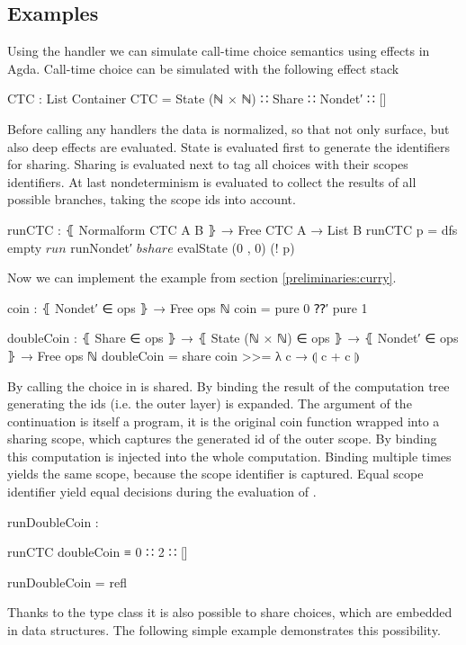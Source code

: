 \subsection{Examples}

Using the handler we can simulate call-time choice semantics using effects in
Agda.
Call-time choice can be simulated with the following effect stack

\begin{code}
CTC : List Container
CTC = State (ℕ × ℕ) ∷ Share ∷ Nondet′ ∷ []
\end{code}
Before calling any handlers the data is normalized, so that not only surface,
but also deep effects are evaluated.
State is evaluated first to generate the identifiers for sharing.
Sharing is evaluated next to tag all choices with their scopes identifiers.
At last nondeterminism is evaluated to collect the results of all possible
branches, taking the scope ids into account.

\begin{code}
runCTC : ⦃ Normalform CTC A B ⦄ → Free CTC A → List B
runCTC p = dfs empty $ run $ runNondet′ $ bshare $ evalState (0 , 0) (! p)
\end{code}
Now we can implement the  example from section
\ref{preliminaries:curry}.

\begin{code}
coin : ⦃ Nondet′ ∈ ops ⦄ → Free ops ℕ
coin = pure 0 ⁇′ pure 1

doubleCoin : ⦃ Share ∈ ops ⦄ → ⦃ State (ℕ × ℕ) ∈ ops ⦄ → ⦃ Nondet′ ∈ ops ⦄ →
  Free ops ℕ
doubleCoin = share coin >>= λ c → ⦇ c + c ⦈
\end{code}
By calling  the choice in  is shared.
By binding the result of  the computation tree generating
the ids (i.e. the outer layer) is expanded.
The argument of the continuation  is itself a program, it is the
original coin function wrapped into a sharing scope, which captures the
generated id of the outer scope.
By binding  this computation is injected into the whole
computation.
Binding  multiple times yields the same scope, because the scope
identifier is captured.
Equal scope identifier yield equal decisions during the evaluation of
.

\begin{center}
\begin{code}
runDoubleCoin :
\end{code}
\begin{code}[inline]
 runCTC doubleCoin ≡ 0 ∷ 2 ∷ []
\end{code}
\begin{code}
runDoubleCoin = refl
\end{code}
\end{center}
Thanks to the  type class it is also possible to share
choices, which are embedded in data structures.
The following simple example demonstrates this possibility.


